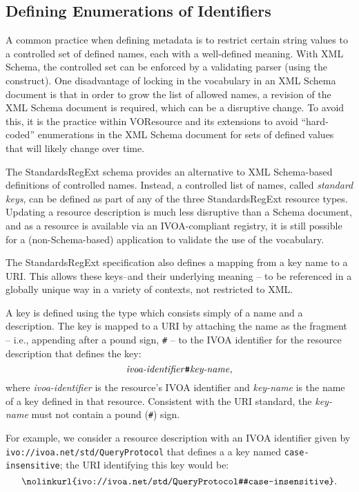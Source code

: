 \documentclass[11pt,a4paper]{ivoa}
\begin{document}
\subsection{Defining Enumerations of Identifiers }
\label{sect:keys}

A common practice when defining metadata is to restrict
certain string values to a controlled set of defined names, each with 
a well-defined meaning.  With XML
Schema, the controlled set can be enforced by a validating parser 
(using the  construct).  
One disadvantage of locking in the
vocabulary in an XML Schema document is that in order to grow the list
of allowed names, a revision of the XML Schema document is required,
which can be a disruptive change.  To avoid this, it is the practice
within VOResource and its extensions to avoid ``hard-coded''
enumerations in the XML Schema document for sets of defined values
that will likely change over time.



The StandardsRegExt schema provides an alternative to XML Schema-based
definitions of controlled names.  Instead, a controlled list of names,
called \emph{standard keys}, can be defined as part of any of the three
StandardsRegExt resource types.  Updating a resource description is much
less disruptive than a Schema document, and as a resource is available
via an IVOA-compliant registry, it is still possible for a
(non-Schema-based) application to validate the use of the vocabulary.  




The StandardsRegExt specification also defines a mapping from a key name to
a URI.  This allows these keys--and their underlying meaning -- to be
referenced in a globally unique way in a variety of contexts, not
restricted to XML.



A key is defined using the  type which
consists simply of a name and a description.  The key is mapped to a
URI by attaching the name as the fragment -- i.e., appending after a
pound sign, \verb|#| -- to the IVOA identifier for the resource
description that defines the key:
$$
\hbox{\emph{ivoa-identifier}\verb|#|\emph{key-name}},
$$
where \emph{ivoa-identifier} is the resource's IVOA identifier and
\emph{key-name} is the name of a key defined in that resource.
Consistent with the URI standard, the
\emph{key-name} must not contain a pound (\verb|#|) sign.



For example, we consider a resource description with an IVOA
identifier given by 
\nolinkurl{ivo://ivoa.net/std/QueryProtocol} that
defines a a key named \texttt{case-insensitive}; the URI
identifying this key would be: 
$$
\hbox{\nolinkurl{ivo://ivoa.net/std/QueryProtocol#case-insensitive}}.
$$
\end{document}

